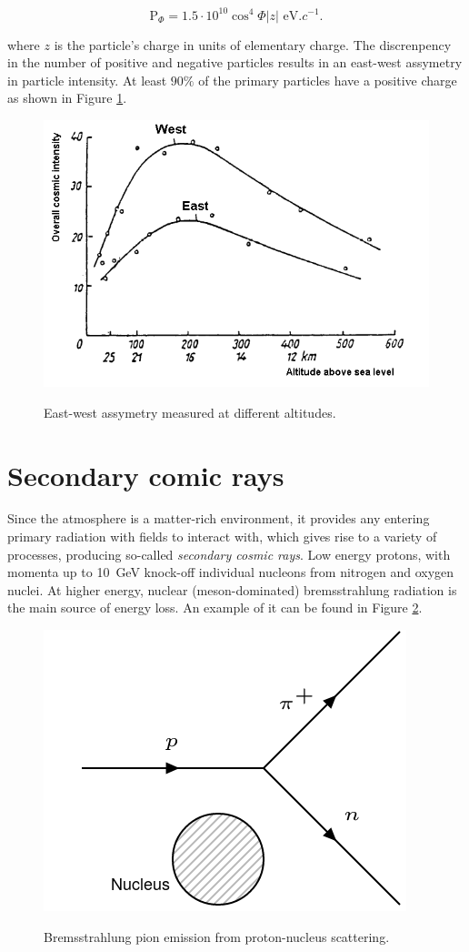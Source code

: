 \begin{equation}
\text{P}_\Phi=1.5\cdot 10^{10} \cos^4\Phi |z| \text{ eV}.c^{-1}.
\end{equation}

where $z$ is the particle's charge in units of elementary charge. The discrenpency in the number of positive and negative particles results in an east-west assymetry in particle intensity. At least $90\%$ of the primary particles have a positive charge as shown in Figure \ref{fig:assym}.

\begin{figure}[htbp] %
\centering
\includegraphics[width=0.8\linewidth]{./fig/assym.png}
\label{fig:assym}
\caption{East-west assymetry measured at different altitudes.}
\end{figure}


\section{Secondary comic rays}

Since the atmosphere is a matter-rich environment, it provides any entering primary radiation with fields to interact with, which gives rise to a variety of processes, producing so-called \textit{secondary cosmic rays}. Low energy protons, with momenta up to \SI{10}{GeV} knock-off individual nucleons from nitrogen and oxygen nuclei. At higher energy, nuclear (meson-dominated) bremsstrahlung radiation is the main source of energy loss. An example of it can be found in Figure \ref{fig:scat}. 

\begin{figure}[htbp]
\centering
\includegraphics[width=0.5\linewidth]{./fig/nscat.png}
\label{fig:scat}
\caption{Bremsstrahlung pion emission from proton-nucleus scattering.}
\end{figure}






